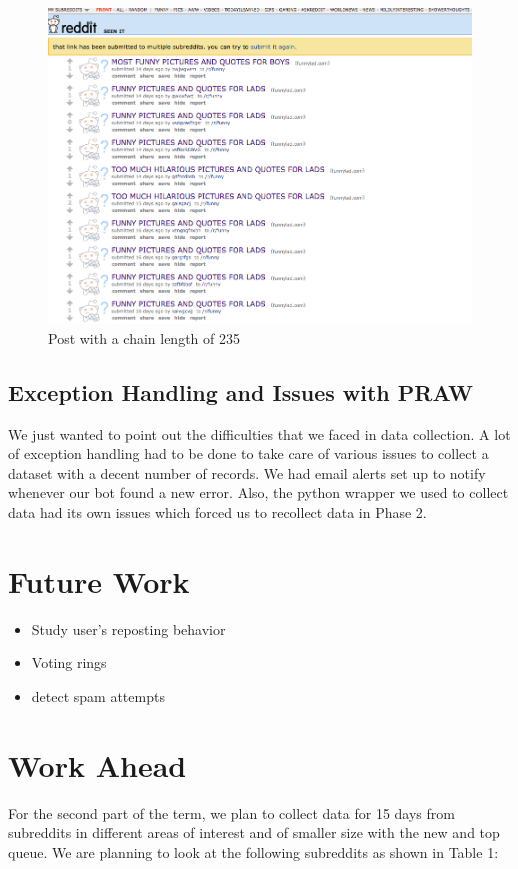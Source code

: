 \documentclass{article} %
\begin{document}
\begin{figure}[h]
\begin{center}
\includegraphics[width=4.5in]{funny.png}
\caption{Post with a chain length of 235}
\end{center}
\end{figure}

\newpage

\subsection{Exception Handling and Issues with PRAW}

We just wanted to point out the difficulties that we faced in data collection. A lot of exception handling had to be done to take care of various issues to collect a dataset with a decent number of records. We had email alerts set up to notify whenever our bot found a new error. Also, the python wrapper we used to collect data had its own issues which forced us to recollect data in Phase 2.

\section{Future Work}

\begin{itemize}
\item Study user's reposting behavior
\item Voting rings
\item detect spam attempts
\end{itemize}

\iffalse
\section{Work Ahead}
For the second part of the term, we plan to collect data for 15 days from subreddits in different areas of interest and of smaller size with the new and top queue. We are planning to look at the following subreddits as shown in Table 1:
\end{document}
